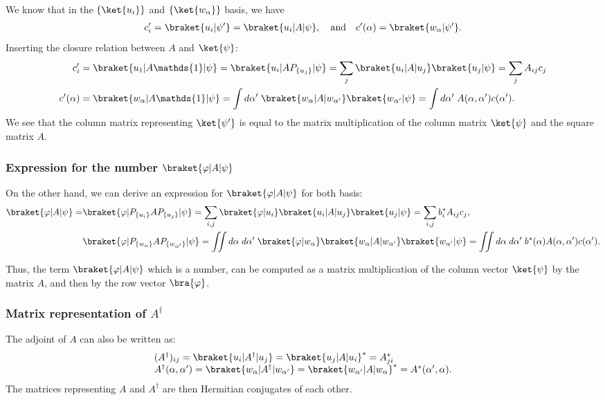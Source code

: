 We know that in the $\{\ket{u_i}\}$ and $\{\ket{w_\alpha}\}$ basis, we have
\begin{align*}
    c_i'=\braket{u_i|\psi'}=\braket{u_i|A|\psi},\quad\text{and}\quad c'(\alpha)=\braket{w_\alpha|\psi'}.
\end{align*}
Inserting the closure relation between $A$ and $\ket{\psi}$:
\begin{align*}
    c_i'&=\braket{u_1|A\mathds{1}|\psi}=\braket{u_i|AP_{\{u_j\}}|\psi}=\sum_j\braket{u_i|A|u_j}\braket{u_j|\psi}=\sum_jA_{ij}c_j\\
   c'(\alpha)&=\braket{w_\alpha|A\mathds{1}|\psi}=\int d\alpha'\;\braket{w_\alpha|A|w_{\alpha'}}\braket{w_{\alpha'}|\psi}=\int d\alpha'\;A(\alpha,\alpha')c(\alpha').
\end{align*}
We see that the column matrix representing $\ket{\psi'}$ is equal to the matrix multiplication of the column matrix $\ket{\psi}$ and the square matrix $A$.
\subsubsection{Expression for the number $\braket{\varphi|A|\psi}$}
On the other hand, we can derive an expression for $\braket{\varphi|A|\psi}$ for both basis:
\begin{align*}
    \braket{\varphi|A|\psi}=&\braket{\varphi|P_{\{u_i\}}AP_{\{u_j\}}|\psi}=\sum_{i,j}\braket{\varphi|u_i}\braket{u_i|A|u_j}\braket{u_j|\psi}=\sum_{i,j}b_i^*A_{ij}c_j,\\
    &\braket{\varphi|P_{\{w_\alpha\}}AP_{\{w_{\alpha'}\}}|\psi}=\iint d\alpha\;d\alpha'\;\braket{\varphi|w_\alpha}\braket{w_\alpha|A|w_{\alpha'}}\braket{w_{\alpha'}|\psi}=\iint d\alpha\;d\alpha'\;b^*(\alpha)A(\alpha,\alpha')c(\alpha').
\end{align*}

Thus, the term $\braket{\varphi|A|\psi}$ which is a number, can be computed as a matrix multiplication of the column vector $\ket{\psi}$ by the matrix $A$, and then by the row vector $\bra{\varphi}$.
\subsubsection{Matrix representation of $A^\dagger$}
The adjoint of $A$ can also be written as:
\begin{align}
    \begin{array}{l}
        (A^\dagger)_{ij}=\braket{u_i|A^\dagger|u_j}=\braket{u_j|A|u_i}^*=A^*_{ji}\\
        A^\dagger(\alpha,\alpha')=\braket{w_\alpha|A^\dagger|w_{\alpha'}}=\braket{w_{\alpha'}|A|w_\alpha}^*=A^*(\alpha',\alpha).
    \end{array}
    \label{eq:adjointoperator}
\end{align}
The matrices representing $A$ and $A^\dagger$ are then Hermitian conjugates of each other.

